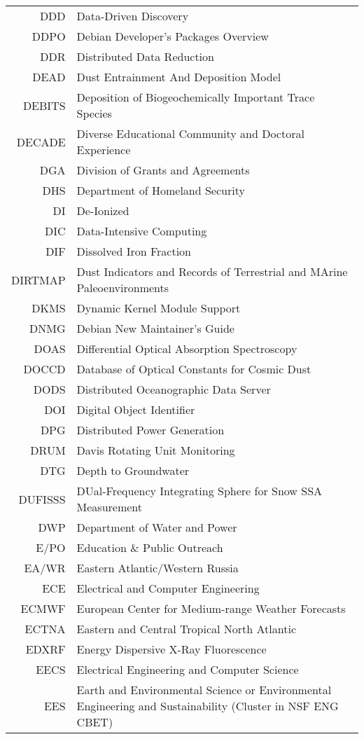 \documentclass[12pt,twoside]{article}
\begin{document}
\begin{longtable}[>{\bfseries}l]{>{\ttfamily}r l}
DDD & Data-Driven Discovery \\
DDPO & Debian Developer's Packages Overview \\
DDR & Distributed Data Reduction \\
DEAD & Dust Entrainment And Deposition Model \\
DEBITS & Deposition of Biogeochemically Important Trace Species \\
DECADE & Diverse Educational Community and Doctoral Experience \\
DGA & Division of Grants and Agreements \\
DHS & Department of Homeland Security \\
DI & De-Ionized \\
DIC & Data-Intensive Computing \\
DIF & Dissolved Iron Fraction \\
DIRTMAP & Dust Indicators and Records of Terrestrial and MArine Paleoenvironments \\
DKMS & Dynamic Kernel Module Support \\
DNMG & Debian New Maintainer's Guide \\
DOAS & Differential Optical Absorption Spectroscopy \\
DOCCD & Database of Optical Constants for Cosmic Dust \\
DODS & Distributed Oceanographic Data Server \\
DOI & Digital Object Identifier \\
DPG & Distributed Power Generation \\
DRUM & Davis Rotating Unit Monitoring \\
DTG & Depth to Groundwater \\
DUFISSS & DUal-Frequency Integrating Sphere for Snow SSA Measurement \\
DWP & Department of Water and Power \\
E/PO & Education \& Public Outreach \\
EA/WR & Eastern Atlantic/Western Russia \\
ECE & Electrical and Computer Engineering \\
ECMWF & European Center for Medium-range Weather Forecasts \\
ECTNA & Eastern and Central Tropical North Atlantic \\
EDXRF & Energy Dispersive X-Ray Fluorescence \\
EECS & Electrical Engineering and Computer Science \\
EES & Earth and Environmental Science or Environmental Engineering and Sustainability (Cluster in NSF ENG CBET) \\

\end{longtable}
\end{document}
